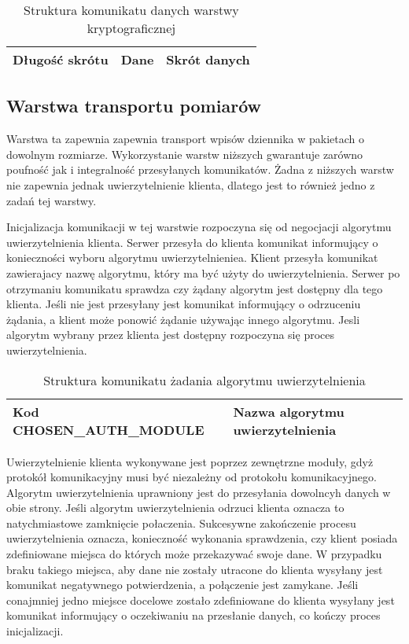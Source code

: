 \begin{table}[H]
\centering
\caption{Struktura komunikatu danych warstwy kryptograficznej }

\begin{tabular}{|p{3cm}|p{6cm}|p{3cm}|}
\hline
Długość skrótu & Dane & Skrót danych\\
\hline
\end{tabular}
\end{table}

\subsection[Warstwa transportu pomiarów][Warstwa transportu pomiarów]{Warstwa transportu pomiarów}

Warstwa ta zapewnia zapewnia transport wpisów dziennika w pakietach o
dowolnym rozmiarze. Wykorzystanie warstw niższych gwarantuje zarówno
poufność jak i integralność przesyłanych komunikatów. Żadna z niższych
warstw nie zapewnia jednak uwierzytelnienie klienta, dlatego jest to
również jedno z zadań tej warstwy.

Inicjalizacja komunikacji w tej warstwie rozpoczyna się od negocjacji
algorytmu uwierzytelnienia klienta. Serwer przesyła do klienta
komunikat informujący o konieczności wyboru algorytmu
uwierzytelnieniea. Klient przesyła komunikat zawierajacy nazwę
algorytmu, który ma być użyty do uwierzytelnienia. Serwer po
otrzymaniu komunikatu sprawdza czy żądany algorytm jest dostępny dla
tego klienta. Jeśli nie jest przesyłany jest komunikat informujący o
odrzuceniu żądania, a klient może ponowić żądanie używając innego
algorytmu. Jesli algorytm wybrany przez klienta jest dostępny
rozpoczyna się proces uwierzytelnienia.

\begin{table}[H]
\centering
\caption{Struktura komunikatu żadania algorytmu uwierzytelnienia }
\begin{tabular}{|p{3cm}|p{6cm}|}
\hline
Kod CHOSEN\_AUTH\_MODULE & Nazwa algorytmu uwierzytelnienia\\
\hline
\end{tabular}
\end{table}

Uwierzytelnienie klienta wykonywane jest poprzez zewnętrzne moduły,
gdyż protokół komunikacyjny musi być niezależny od protokołu
komunikacyjnego. Algorytm uwierzytelnienia uprawniony jest do
przesyłania dowolncyh danych w obie strony. Jeśli algorytm
uwierzytelnienia odrzuci klienta oznacza to natychmiastowe zamknięcie
połaczenia. Sukcesywne zakończenie procesu uwierzytelnienia oznacza,
konieczność wykonania sprawdzenia, czy klient posiada zdefiniowane
miejsca do których może przekazywać swoje dane. W przypadku braku
takiego miejsca, aby dane nie zostały utracone do klienta wysyłany
jest komunikat negatywnego potwierdzenia, a połączenie jest
zamykane. Jeśli conajmniej jedno miejsce docelowe zostało zdefiniowane
do klienta wysyłany jest komunikat informujący o oczekiwaniu na
przesłanie danych, co kończy proces inicjalizacji.

